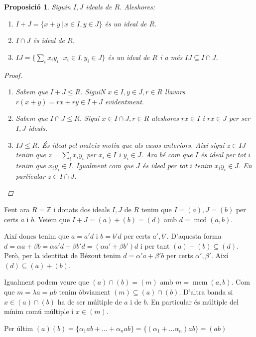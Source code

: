 \documentclass[a4paper,11pt]{report}
\newcommand{\barra}{\,|\,}
\DeclareMathOperator{\mcd}{mcd}
\DeclareMathOperator{\mcm}{mcm}
\theoremstyle{theorem}
\newtheorem{proposicio}{\normalfont \sffamily\bfseries Proposició}[section]
\theoremstyle{definition}
\begin{document}
\begin{proposicio}
	Siguin $I,J$ ideals de $R$. Aleshores:
	\begin{enumerate}
		\item $I+J=\{x+y\barra x\in I, y\in J\}$ és un ideal de $R$.\item $I\cap J$ és ideal de $R$.
		\item $IJ=\{\sum_{i}x_i y_i\barra x_i\in I, y_i\in J\}$ és un ideal de $R$ i a més $IJ\subseteq I\cap J$.
	\end{enumerate}
\begin{proof}
	\begin{enumerate}
		\item Sabem que $I+J\leq R$. SiguiN $x\in I,y\in J,r\in R$ llavors $r(x+y)=rx+ry\in I+J$ evidentment.
		\item Sabem que $I\cap J\leq R$. Sigui $x\in I\cap J, r\in R$ aleshores $rx\in I $ i $rx\in J$ per ser $I,J$ ideals.
		\item $IJ\leq R$. És ideal pel mateix motiu que als casos anteriors. Així sigui $z\in IJ$ tenim que $z=\sum_{i}x_iy_i$ per $x_i\in I$ i $y_i\in J$. Ara bé com que $I$ és ideal per tot $i$ tenim que $x_iy_i\in I$. Igualment com que $J$ és ideal per tot $i$ tenim $x_iy_i\in J$. En particular $z\in I\cap J$.
	\end{enumerate}
\end{proof}
\end{proposicio}

Fent ara $R=\mathbb{Z}$ i donats dos ideals $I,J$ de $R$ tenim que $I=(a),J=(b)$ per certs $a$ i $b$. Veiem que $I+J=(a)+(b)=(d)$ amb $d=\mcd(a,b)$.

Així doncs tenim que $a=a'd$ i $b=b'd$ per certs $a',b'$. D'aquesta forma $d=\alpha a+\beta b=\alpha a' d+
\beta b' d=(\alpha a'+\beta b')d$ i per tant $(a)+(b)\subseteq (d)$. Però, per la identitat de Bézout tenim $d=\alpha' a+\beta' b$ per certs $\alpha',\beta'$. Així $(d)\subseteq (a)+(b)$.

Igualment podem veure que $(a)\cap(b)=(m)$ amb $m=\mcm(a,b)$. Com que $m=\lambda a=\mu b$ tenim òbviament $(m)\subseteq(a)\cap (b)$. D'altra banda si $x\in (a)\cap(b)$ ha de ser múltiple de $a$ i de $b$. En particular és múltiple del mínim comú múltiple i $x\in (m)$.

Per últim $(a) (b)=\{\alpha_1 ab+\ldots+\alpha_n ab\}=\{(\alpha_1+\ldots\alpha_n)ab\}=(ab)$
\end{document}
